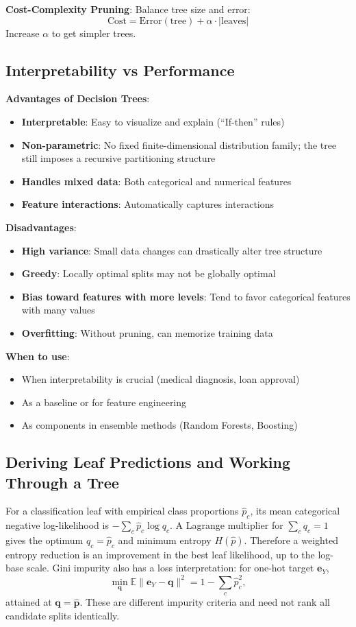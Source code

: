 \documentclass[11pt,twoside]{article}
\numberwithin{equation}{section}
\newcommand{\E}{\mathbb{E}}
\newcommand{\vect}[1]{\bm{#1}}
\theoremstyle{plain}
\theoremstyle{definition}
\theoremstyle{remark}
\newenvironment{keyidea}{
  \begin{tcolorbox}[colback=yellow!5!white,
                    colframe=yellow!50!black,
                    title=Key Idea,
                    breakable,
                    enhanced,
                    sharp corners,
                    boxrule=0.8pt,
                    left=6pt, right=6pt, top=6pt, bottom=6pt]
}{
  \end{tcolorbox}
}
\begin{document}
\textbf{Cost-Complexity Pruning}: Balance tree size and error:
\[
\text{Cost} = \text{Error}(\text{tree}) + \alpha \cdot |\text{leaves}|
\]
Increase $\alpha$ to get simpler trees.

\subsection{Interpretability vs Performance}

\begin{keyidea}
\textbf{Advantages of Decision Trees}:
\begin{itemize}
\item \textbf{Interpretable}: Easy to visualize and explain (``If-then'' rules)
\item \textbf{Non-parametric}: No fixed finite-dimensional distribution family; the tree still imposes a recursive partitioning structure
\item \textbf{Handles mixed data}: Both categorical and numerical features
\item \textbf{Feature interactions}: Automatically captures interactions
\end{itemize}

\textbf{Disadvantages}:
\begin{itemize}
\item \textbf{High variance}: Small data changes can drastically alter tree structure
\item \textbf{Greedy}: Locally optimal splits may not be globally optimal
\item \textbf{Bias toward features with more levels}: Tend to favor categorical features with many values
\item \textbf{Overfitting}: Without pruning, can memorize training data
\end{itemize}

\textbf{When to use}:
\begin{itemize}
\item When interpretability is crucial (medical diagnosis, loan approval)
\item As a baseline or for feature engineering
\item As components in ensemble methods (Random Forests, Boosting)
\end{itemize}
\end{keyidea}

\subsection{Deriving Leaf Predictions and Working Through a Tree}
For a classification leaf with empirical class proportions $\hat p_c$, its mean categorical negative log-likelihood is $-\sum_c\hat p_c\log q_c$. A Lagrange multiplier for $\sum_c q_c=1$ gives the optimum $q_c=\hat p_c$ and minimum entropy $H(\hat p)$. Therefore a weighted entropy reduction is an improvement in the best leaf likelihood, up to the log-base scale. Gini impurity also has a loss interpretation: for one-hot target $\vect e_Y$,
\[
\min_{\vect q}\E\|\vect e_Y-\vect q\|^2
=1-\sum_c\hat p_c^2,
\]
attained at $\vect q=\hat{\vect p}$. These are different impurity criteria and need not rank all candidate splits identically.
\end{document}
